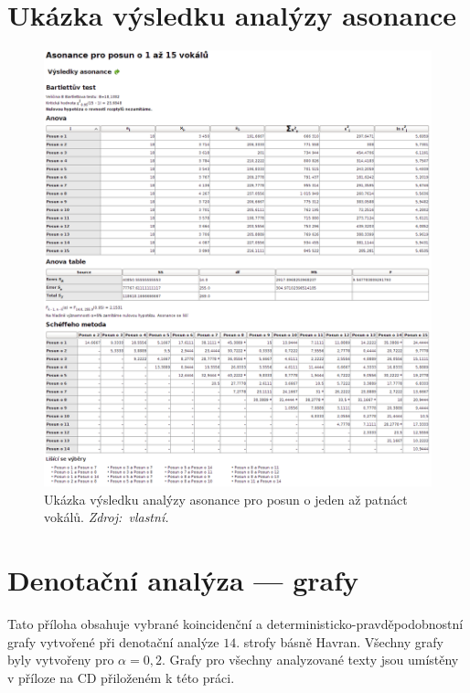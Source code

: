 \documentclass[dp.tex]{subfiles}
\begin{document}
\chapter{Ukázka výsledku analýzy asonance}
\label{appendix:asonance}
\begin{figure}[H]
	\centering
	\includegraphics[max width=\textwidth,keepaspectratio=true]{imgs-70-prakticka/assonance}
	\caption[Ukázka výsledku analýzy asonance pro posun o jeden až patnáct vokálů.]{Ukázka výsledku analýzy asonance pro posun o jeden až patnáct vokálů. \textit{Zdroj:~vlastní.}}
	\label{fig:denotation-resler-007}
\end{figure}


\chapter{Denotační analýza --- grafy}
\label{appendix:grafy}

Tato příloha obsahuje vybrané koincidenční a deterministicko-pravděpodobnostní grafy vytvořené při denotační analýze $14.$ strofy básně Havran. Všechny grafy byly vytvořeny pro $\alpha = 0{,}2$. Grafy pro všechny analyzované texty jsou umístěny v příloze na CD přiloženém k této práci.
\end{document}
